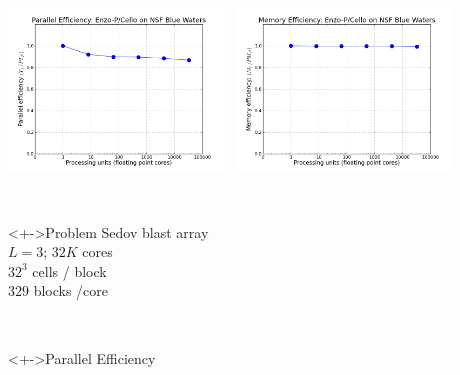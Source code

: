 \NEWSEC

\subsection{\ssScaling}

\begin{frame}[fragile,label=ss-scaling] 
\secframetitle{\ssScaling}
\begin{center}
\begin{minipage}{4.50in}
\includegraphics[width=2.25in]{scale-eff.png} \ 
\includegraphics[width=2.25in]{scale-mem.png}
\end{minipage} \\
\begin{minipage}{4.0in}
\footnotesize
\pause
\begin{minipage}[t]{1.20in}
\blockblue
\begin{block}<+->{Problem}
Sedov blast array \\
$L=3$; $32K$ cores \\
$32^3$ cells / block \\
$329$ blocks /core
\end{block}
\end{minipage} \
\begin{minipage}[t]{1.20in}
\blockgreen
\begin{block}<+->{Parallel Efficiency}

\end{block}
\end{minipage}
\end{minipage}
\end{center}
\end{frame}
